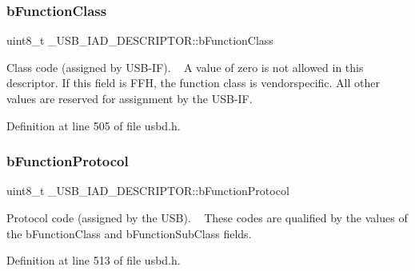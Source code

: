 \mbox{\label{struct___u_s_b___i_a_d___d_e_s_c_r_i_p_t_o_r_a4395c6765bf418652bcf73626731518b}} 
\subsubsection{\texorpdfstring{b\+Function\+Class}{bFunctionClass}}
{\footnotesize\ttfamily uint8\+\_\+t \+\_\+\+U\+S\+B\+\_\+\+I\+A\+D\+\_\+\+D\+E\+S\+C\+R\+I\+P\+T\+O\+R\+::b\+Function\+Class}

Class code (assigned by U\+S\+B-\/\+IF). ~\newline
A value of zero is not allowed in this descriptor. If this field is F\+FH, the function class is vendorspecific. All other values are reserved for assignment by the U\+S\+B-\/\+IF. 

Definition at line 505 of file usbd.\+h.

\mbox{\label{struct___u_s_b___i_a_d___d_e_s_c_r_i_p_t_o_r_ab0aa68806b463f0ce4ffdcfb5c1bbba4}} 
\subsubsection{\texorpdfstring{b\+Function\+Protocol}{bFunctionProtocol}}
{\footnotesize\ttfamily uint8\+\_\+t \+\_\+\+U\+S\+B\+\_\+\+I\+A\+D\+\_\+\+D\+E\+S\+C\+R\+I\+P\+T\+O\+R\+::b\+Function\+Protocol}

Protocol code (assigned by the U\+SB). ~\newline
These codes are qualified by the values of the b\+Function\+Class and b\+Function\+Sub\+Class fields. 

Definition at line 513 of file usbd.\+h.

